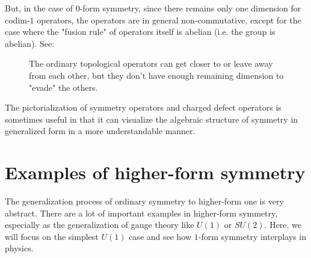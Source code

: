 \documentclass{ltjsarticle}
\theoremstyle{mystyle} %
\numberwithin{equation}{section}
\begin{document}
But, in the case of $0$-form symmetry, since there remains only one dimension for codim-$1$ operators, 
the operators are in general non-commutative, except for the case where the "fusion rule" of operators itself is abelian (i.e. the group is abelian). 
See: 
\begin{figure}[H]
    \centering
    \caption{The ordinary topological operators can get closer to or leave away from each other, 
    but they don't have enough remaining dimension to "evade" the others. }
    \label{fig:my_label}
    \end{figure}
    The pictorialization of symmetry operators and charged defect operators is 
    sometimes useful in that it can visualize the algebraic structure of symmetry in generalized form 
    in a more understandable manner. 
\newpage
\section{Examples of higher-form symmetry}
The generalization process of ordinary symmetry to higher-form one is very abstract. 
There are a lot of important examples in higher-form symmetry, especially as the generalization of gauge theory like 
$U(1)$ or $SU(2)$. 
Here, we will focus on the simplest $U(1)$ case and see how $1$-form symmetry interplays in physics. 
\end{document}
